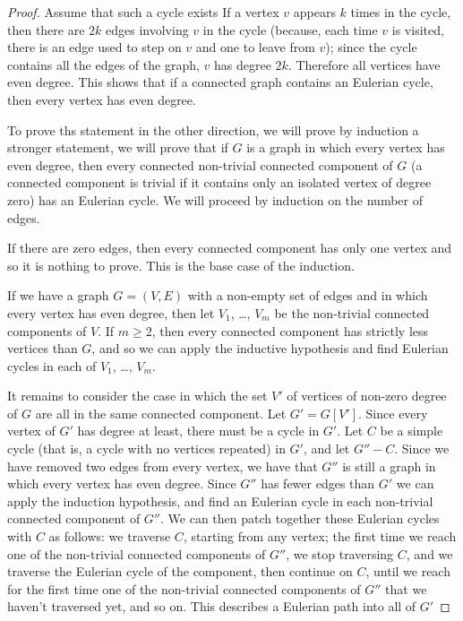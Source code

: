 \begin{proof}
  Assume that such a cycle exists
  If a vertex $v$ appears $k$ times in the cycle, then there are $2k$ edges
  involving $v$ in the cycle (because, each time $v$ is visited, there is an
  edge used to step on $v$ and one to leave from $v$); since the cycle contains
  all the edges of the graph, $v$ has degree $2k$. Therefore all vertices have
  even degree. This shows that if a connected graph contains an Eulerian cycle,
  then every vertex has even degree.

  To prove ths statement in the other direction, we will prove by induction a
  stronger statement, we will prove that if $G$ is a graph in which every
  vertex has even degree, then every connected non-trivial connected
  component of $G$ (a connected component is trivial if it contains only an
  isolated vertex of degree zero) has an Eulerian cycle. We will proceed by
  induction on the number of edges.

  If there are zero edges, then every connected component has only one vertex
  and so it is nothing to prove. This is the base case of the induction.

  If we have a graph $G = (V,E)$ with a non-empty set of edges and in which
  every vertex has even degree, then let $V_1$, \dots, $V_m$ be the non-trivial
  connected components of $V$. If $m \ge 2$, then every connected component has
  strictly less vertices than $G$, and so we can apply the inductive hypothesis
  and find Eulerian cycles in each of $V_1$, \dots, $V_m$.

  It remains to consider the case in which the set $V'$ of vertices of non-zero
  degree of $G$ are all in the same connected component. Let $G' = G[V']$.
  Since every vertex of $G'$ has degree at least, there must be a cycle in
  $G'$. Let $C$ be a simple cycle (that is, a cycle with no vertices repeated)
  in $G'$, and let $G'' - C$. Since we have removed two edges from every
  vertex, we have that $G''$ is still a graph in which every vertex has even
  degree. Since $G''$ has fewer edges than $G'$ we can apply the induction
  hypothesis, and find an Eulerian cycle in each non-trivial connected
  component of $G''$. We can then patch together these Eulerian cycles with $C$
  as follows: we traverse $C$, starting from any vertex; the first time we
  reach one of the non-trivial connected components of $G''$, we stop
  traversing $C$, and we traverse the Eulerian cycle of the component, then
  continue on $C$, until we reach for the first time one of the non-trivial
  connected components of $G''$ that we haven’t traversed yet, and so on. This
  describes a Eulerian path into all of $G'$
\end{proof}

